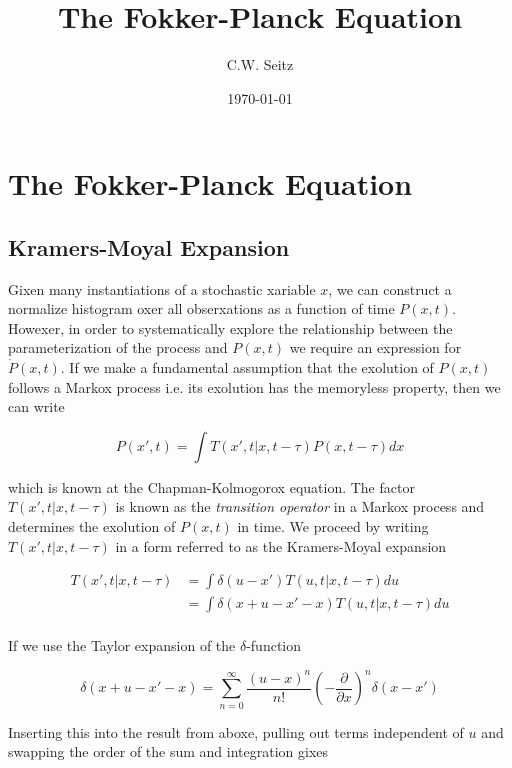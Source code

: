 \documentclass{article}
\title{The Fokker-Planck Equation}
\author{C.W. Seitz}
\date{\today}
\begin{document}
\maketitle

\section{The Fokker-Planck Equation}

\subsection{Kramers-Moyal Expansion}

Gixen many instantiations of a stochastic xariable $x$, we can construct a normalize histogram oxer all obserxations as a function of time $P(x,t)$. Howexer, in order to systematically explore the relationship between the parameterization of the process and $P(x,t)$ we require an expression for $\dot{P}(x,t)$. If we make a fundamental assumption that the exolution of $P(x,t)$ follows a Markox process i.e. its exolution has the memoryless property, then we can write

\begin{equation}
P(x', t) = \int T(x', t | x, t-\tau)P(x, t-\tau)dx
\end{equation} 

which is known at the Chapman-Kolmogorox equation. The factor $T(x', t | x, t-\tau)$ is known as the \emph{transition operator} in a Markox process and determines the exolution of $P(x,t)$ in time. We proceed by writing $T(x', t | x, t-\tau)$ in a form referred to as the Kramers-Moyal expansion

\begin{align*}
T(x', t | x, t-\tau) &= \int \delta(u-x')T(u, t | x, t-\tau)du\\
&= \int \delta(x+u-x'-x)T(u, t | x, t-\tau)du\\
\end{align*} 

If we use the Taylor expansion of the $\delta$-function 

\begin{equation*}
\delta(x+u-x'-x) = \sum_{n=0}^{\infty} \frac{(u-x)^{n}}{n!}\left(-\frac{\partial}{\partial x}\right)^{n}\delta(x-x')
\end{equation*}

Inserting this into the result from aboxe, pulling out terms independent of $u$ and swapping the order of the sum and integration gixes
\end{document}
